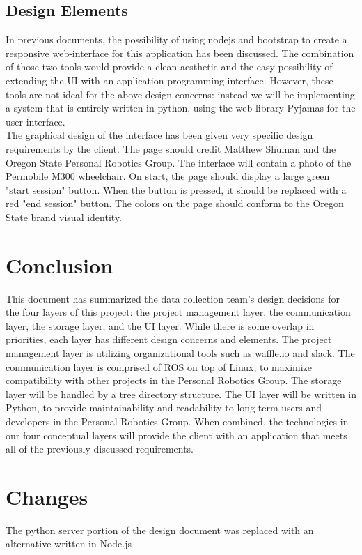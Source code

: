 \documentclass[onecolumn, draftclsnofoot,10pt, compsoc]{report}
\begin{document}
\subsection{Design Elements}
In previous documents, the possibility of using nodejs and bootstrap to create a responsive web-interface for this application has been discussed. The combination of those two tools would provide a clean aesthetic and the easy possibility of extending the UI with an application programming interface. However, these tools are not ideal for the above design concerns: instead we will be implementing a system that is entirely written in python, using the web library Pyjamas for the user interface. 
\\
The graphical design of the interface has been given very specific design requirements by the client. The page should credit Matthew Shuman and the Oregon State Personal Robotics Group. The interface will contain a photo of the Permobile M300 wheelchair. On start, the page should display a large green "start session" button. When the button is pressed, it should be replaced with a red "end session" button. The colors on the page should conform to the Oregon State brand visual identity.

\section{Conclusion}
This document has summarized the data collection team's design decisions for the four layers of this project: the project management layer, the communication layer, the storage layer, and the UI layer. While there is some overlap in priorities, each layer has different design concerns and elements. The project management layer is utilizing organizational tools such as waffle.io and slack. The communication layer is comprised of ROS on top of Linux, to maximize compatibility with other projects in the Personal Robotics Group. The storage layer will be handled by a tree directory structure. The UI layer will be written in Python, to provide maintainability and readability to long-term users and developers in the Personal Robotics Group. When combined, the technologies in our four conceptual layers will provide the client with an application that meets all of the previously discussed requirements.

\section{Changes}
The python server portion of the design document was replaced with an alternative written in Node.js
\end{document}
